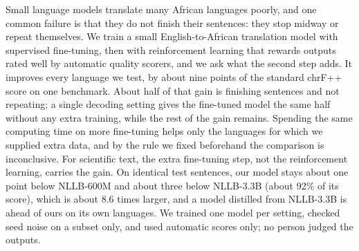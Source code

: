 Small language models translate many African languages poorly, and one common failure is that they do not finish their sentences: they stop midway or repeat themselves. We train a small English-to-African translation model with supervised fine-tuning, then with reinforcement learning that rewards outputs rated well by automatic quality scorers, and we ask what the second step adds. It improves every language we test, by about nine points of the standard chrF++ score on one benchmark. About half of that gain is finishing sentences and not repeating; a single decoding setting gives the fine-tuned model the same half without any extra training, while the rest of the gain remains. Spending the same computing time on more fine-tuning helps only the languages for which we supplied extra data, and by the rule we fixed beforehand the comparison is inconclusive. For scientific text, the extra fine-tuning step, not the reinforcement learning, carries the gain. On identical test sentences, our model stays about one point below NLLB-600M and about three below NLLB-3.3B (about 92\% of its score), which is about 8.6 times larger, and a model distilled from NLLB-3.3B is ahead of ours on its own languages. We trained one model per setting, checked seed noise on a subset only, and used automatic scores only; no person judged the outputs.
